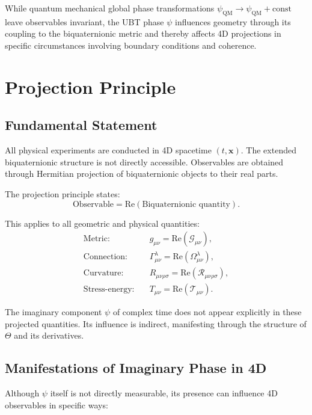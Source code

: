 \documentclass[12pt]{article}
\begin{document}
While quantum mechanical global phase transformations $\psi_{\text{QM}} \to \psi_{\text{QM}} + \text{const}$ leave observables invariant, the UBT phase $\psi$ influences geometry through its coupling to the biquaternionic metric and thereby affects 4D projections in specific circumstances involving boundary conditions and coherence.

\section{Projection Principle}

\subsection{Fundamental Statement}

All physical experiments are conducted in 4D spacetime $(t, \mathbf{x})$. The extended biquaternionic structure is not directly accessible. Observables are obtained through Hermitian projection of biquaternionic objects to their real parts.

The projection principle states:
\begin{equation}
\text{Observable} = \text{Re}(\text{Biquaternionic quantity}).
\label{eq:projection_principle}
\end{equation}

This applies to all geometric and physical quantities:
\begin{align}
\text{Metric:} \quad & g_{\mu\nu} = \text{Re}(\mathcal{G}_{\mu\nu}), \\
\text{Connection:} \quad & \Gamma^\lambda_{\mu\nu} = \text{Re}(\Omega^\lambda_{\mu\nu}), \\
\text{Curvature:} \quad & R_{\mu\nu\rho\sigma} = \text{Re}(\mathcal{R}_{\mu\nu\rho\sigma}), \\
\text{Stress-energy:} \quad & T_{\mu\nu} = \text{Re}(\mathcal{T}_{\mu\nu}).
\end{align}

The imaginary component $\psi$ of complex time does not appear explicitly in these projected quantities. Its influence is indirect, manifesting through the structure of $\Theta$ and its derivatives.

\subsection{Manifestations of Imaginary Phase in 4D}

Although $\psi$ itself is not directly measurable, its presence can influence 4D observables in specific ways:
\end{document}
